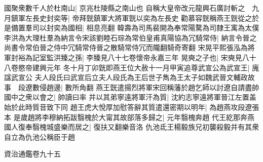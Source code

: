 國聚衆數千人於杜南山|{
	京兆杜陵縣之南山也}
自稱大皇帝改元龍興石廣討斬之　九月鎮軍左長史封奕等|{
	帝拜皝鎮軍大將軍皝以奕為左長史}
勸慕容皝稱燕王皝從之於是備置羣司以封奕為國相|{
	相息亮翻}
韓壽為司馬裴開為奉常陽騖為司隸王㝢為太僕李洪為大理杜羣為納言令宋該劉睦石琮為常伯皇甫真陽協為冗騎常侍|{
	納言令晉之尚書令常伯晉之侍中冗騎常侍晉之散騎常侍冗而隴翻騎奇寄翻}
宋晃平熙張泓為將軍封裕為記室監洪臻之孫|{
	李臻見八十七卷懷帝永嘉三年}
晃奭之子也|{
	宋奭見八十八卷愍帝建興元年}
冬十月丁卯皝即燕王位大赦十一月甲寅追尊武宣公為武宣王|{
	廆諡武宣公}
夫人段氏曰武宣后立夫人段氏為王后世子雋為王太子如魏武晉文輔政故事　段遼數侵趙邊|{
	數所角翻}
燕王皝遣揚烈將軍宋回稱藩於趙乞師以討遼自請盡帥國中之衆以會之|{
	帥讀曰率}
并以其弟寧遠將軍汗為質|{
	沈約志寧遠將軍晉江左置盖始於此時質音致下同}
趙王虎大悅厚加慰答辭其質遣還密期以明年|{
	為趙燕攻段遼張本}
是歲趙將李穆納拓跋翳槐於大甯其故部落多歸之|{
	元年翳槐奔趙}
代王紇那奔燕國人復奉翳槐城盛樂而居之|{
	復扶又翻樂音洛}
仇池氐王楊毅族兄初襲殺毅并有其衆自立為仇池公稱臣于趙

資治通鑑卷九十五
